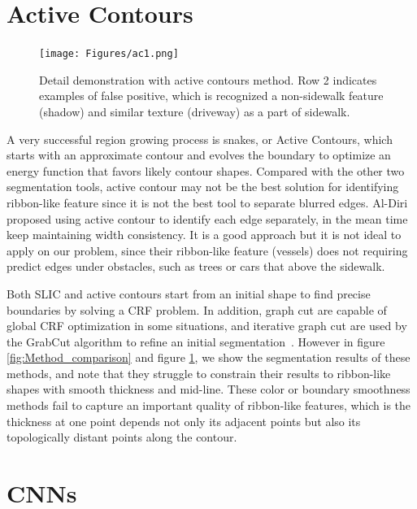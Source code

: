 \section{Active Contours}

\begin{figure}[H]
    \centering
    \texttt{[image: Figures/ac1.png]}
    \caption[Example of Active Contours]{Detail demonstration with active contours method. Row 2 indicates examples of false positive, which is recognized a non-sidewalk feature (shadow) and similar texture (driveway) as a part of sidewalk.}
    \label{fig:ac}
\end{figure}

A very successful region growing process is snakes, or Active Contours, which starts with an approximate contour and evolves the boundary to optimize an energy function that favors likely contour shapes. 
Compared with the other two segmentation tools, active contour may not be the best solution for identifying ribbon-like feature since it is not the best tool to separate blurred edges.
Al-Diri~\cite{ActiveContou09} proposed using active contour to identify each edge separately, in the mean time keep maintaining width consistency. 
It is a good approach but it is not ideal to apply on our problem, since their ribbon-like feature (vessels) does not requiring predict edges under obstacles, such as trees or cars that above the sidewalk.


Both \ac{SLIC} and active contours start from an initial shape to find precise boundaries by solving a \ac{CRF} problem. 
In addition, graph cut are capable of global \ac{CRF} optimization in some situations, and iterative graph cut are used by the GrabCut algorithm to refine an initial segmentation~\cite{Rother2004-ou}. However in figure \ref{fig:Method_comparison} and figure \ref{fig:ac}, we show the segmentation results of these methods, and note that they struggle to constrain their results to ribbon-like shapes with smooth thickness and mid-line.
These color or boundary smoothness methods fail to capture an important quality of ribbon-like features, which is the thickness at one point depends not only its adjacent points but also its topologically distant points along the contour.

\section{\ac{CNNs}}

